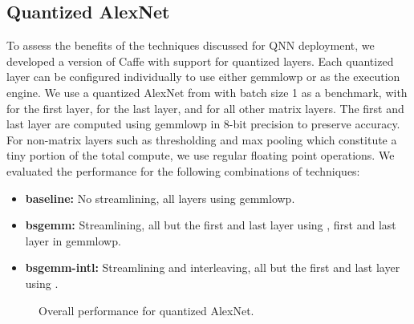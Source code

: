 \documentclass[sigconf]{acmart}
\begin{document}
\subsection{Quantized AlexNet}
To assess the benefits of the techniques discussed for QNN deployment, we developed a version of Caffe with support for quantized layers. 
Each quantized layer can be configured individually to use either gemmlowp or \ours{} as the execution engine.
We use a quantized \qnn AlexNet from \cite{hwgq} with batch size 1 as a benchmark, with  for the first layer,  for the last layer, and  for all other matrix layers.
The first and last layer are computed using gemmlowp in 8-bit precision to preserve accuracy.
For non-matrix layers such as thresholding and max pooling which constitute a tiny portion of the total compute, we use regular floating point operations.
We evaluated the performance for the following combinations of techniques:

\begin{itemize}
	\item \textbf{baseline:} No streamlining, all layers using gemmlowp.
	\item \textbf{bsgemm:} Streamlining, all but the first and last layer using \ours{}, first and last layer in gemmlowp.
	\item \textbf{bsgemm-intl:} Streamlining and interleaving, all but the first and last layer using \ours{} .
\end{itemize}	

\begin{figure}
	\footnotesize
	\caption{Overall performance for quantized AlexNet.}
	\label{fig:breakdown}
\end{figure}
\end{document}
